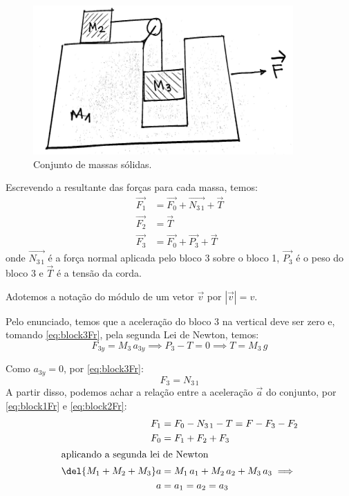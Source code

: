 \documentclass[]{IMTexam}
\begin{document}
\begin{questions}
	\begin{figure}[H]
		\centering
		\includegraphics[width=0.4\linewidth]{screenshot001}
		\caption{Conjunto de massas sólidas.}
		\label{fig:fig1}
	\end{figure}

	\clearpage


	\begin{solution}
		Escrevendo a resultante das forças para cada massa, temos:
		\begin{align}
			\vec{F_1} & =\vec{F_0}+\vec{N_{3\,1}}+\vec{T}\label{eq:block1Fr} \\
			\vec{F_2} & =\vec{T}\label{eq:block2Fr}                          \\
			\vec{F_3} & =\vec{F_0}+\vec{P_3}+\vec{T}\label{eq:block3Fr}
		\end{align}
		onde $\vec{N_{3\,1}}$ é a força normal aplicada pelo bloco 3 sobre o bloco 1, $ \vec{P_3} $ é o peso do bloco 3 e $ \vec{T} $ é a tensão da corda.

		Adotemos a notação do módulo de um vetor $ \vec{v} $ por $ |\vec{v}|=v $.

		Pelo enunciado, temos que a aceleração do bloco 3 na vertical deve ser zero e, tomando \ref{eq:block3Fr}, pela segunda Lei de Newton, temos:
		\begin{equation}\label{eq:f3yQ2}
			F_{3y}=M_3\,a_{3y}\implies P_3-T=0\implies T=M_3\,g
		\end{equation}

		Como $ a_{3y}=0 $, por \ref{eq:block3Fr}:
		\[ F_3=N_{3\,1}  \]
		A partir disso, podemos achar a relação entre a aceleração $ \vec{a} $ do conjunto, por \ref{eq:block1Fr} e \ref{eq:block2Fr}:
		\begin{align*}
			F_1                & =F_0-N_{3\,1}-T=F-F_3-F_2           \\
			F_0                & =F_1+F_2+F_3                        \\
			\intertext{aplicando a segunda lei de Newton}
			\del{M_1+M_2+M_3}a & =M_1\,a_1+M_2\,a_2+M_3\,a_3\implies \\
			a                  & =a_1=a_2=a_3
		\end{align*}


\end{solution}
\end{questions}
\end{document}
